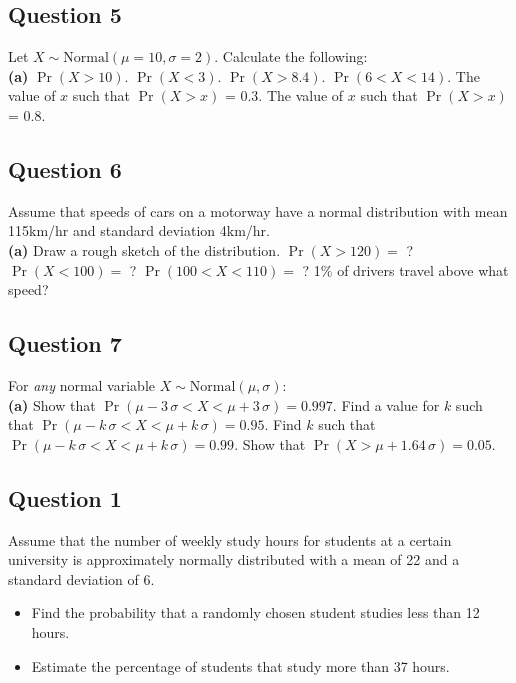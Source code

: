 \documentclass[]{article}
\begin{document}
\subsection*{Question 5}
Let $X \sim \text{Normal}(\mu=10,\sigma=2)$. Calculate the following:\\[-0.2cm]

{\bf(a)} $\Pr(X>10)$.  $\Pr(X<3)$.  $\Pr(X>8.4)$.  $\Pr(6<X<14)$.  The value of $x$ such that $\Pr(X>x)$ = 0.3.  The value of $x$ such that $\Pr(X>x)$ = 0.8.



\subsection*{Question 6}
Assume that speeds of cars on a motorway have a normal distribution with mean 115km/hr and standard deviation 4km/hr.\\[-0.2cm]

{\bf(a)} Draw a rough sketch of the distribution.  $\Pr(X>120)=$ ?  $\Pr(X<100)=$ ?  $\Pr(100<X<110)=$ ?  1\% of drivers travel above what speed?







\subsection*{Question 7}
For \emph{any} normal variable $X \sim \text{Normal}(\mu,\sigma)$:\\[-0.2cm]

{\bf(a)} Show that $\Pr(\mu-3\,\sigma<X<\mu+3\,\sigma) = 0.997$.  Find a value for $k$ such that $\Pr(\mu-k\,\sigma<X<\mu+k\,\sigma) = 0.95$.  Find $k$ such that $\Pr(\mu-k\,\sigma<X<\mu+k\,\sigma) = 0.99$.  Show that $\Pr(X>\mu+1.64\,\sigma) = 0.05.$



\subsection*{Question 1}

Assume that the number of weekly study hours for students at a certain university
	is approximately normally distributed with a mean of 22 and a standard deviation
	of 6.
	\begin{itemize}
		\item Find the probability that a randomly chosen student studies less than 12
		hours.
		\item Estimate the percentage of students that study more than 37 hours.
	\end{itemize}
\end{document}
